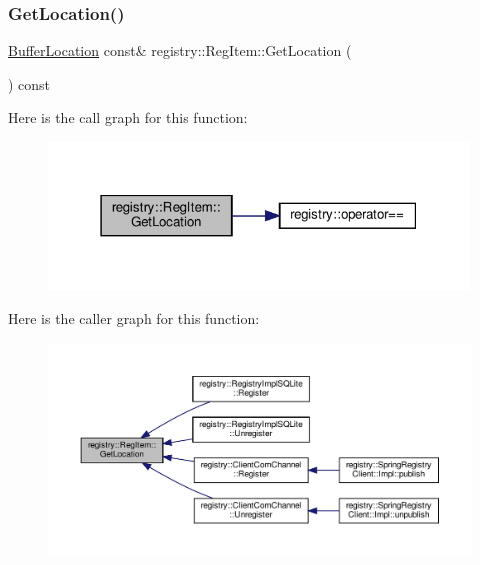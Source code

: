 \subsubsection{\texorpdfstring{Get\+Location()}{GetLocation()}}
{\footnotesize\ttfamily \hyperlink{structregistry_1_1BufferLocation}{Buffer\+Location} const\& registry\+::\+Reg\+Item\+::\+Get\+Location (\begin{DoxyParamCaption}{ }\end{DoxyParamCaption}) const\hspace{0.3cm}{\ttfamily [inline]}}

Here is the call graph for this function\+:
\nopagebreak
\begin{figure}[H]
\begin{center}
\leavevmode
\includegraphics[width=316pt]{classregistry_1_1RegItem_a97aa7215ece49480a08c9cce9f8ed391_cgraph}
\end{center}
\end{figure}
Here is the caller graph for this function\+:
\nopagebreak
\begin{figure}[H]
\begin{center}
\leavevmode
\includegraphics[width=350pt]{classregistry_1_1RegItem_a97aa7215ece49480a08c9cce9f8ed391_icgraph}
\end{center}
\end{figure}
\mbox{\label{classregistry_1_1RegItem_a36de17d47505b30932fb0666e151a3a5}} 
